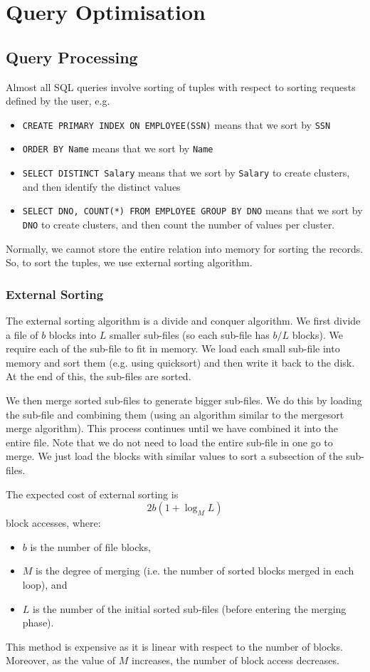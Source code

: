 \documentclass[a4paper, openany]{memoir}
\theoremstyle{definition}
\theoremstyle{plain}
\begin{document}
\chapter{Query Optimisation}
\section{Query Processing}
Almost all SQL queries involve sorting of tuples with respect to sorting requests defined by the user, e.g.
\begin{itemize}
    \item \texttt{CREATE PRIMARY INDEX ON EMPLOYEE(SSN)} means that we sort by \texttt{SSN}
    \item \texttt{ORDER BY Name} means that we sort by \texttt{Name}
    \item \texttt{SELECT DISTINCT Salary} means that we sort by \texttt{Salary} to create clusters, and then identify the distinct values
    \item \texttt{SELECT DNO, COUNT(*) FROM EMPLOYEE GROUP BY DNO} means that we sort by \texttt{DNO} to create clusters, and then count the number of values per cluster.
\end{itemize}
Normally, we cannot store the entire relation into memory for sorting the records. So, to sort the tuples, we use external sorting algorithm.

\subsection{External Sorting}
The external sorting algorithm is a divide and conquer algorithm. We first divide a file of $b$ blocks into $L$ smaller sub-files (so each sub-file has $b/L$ blocks). We require each of the sub-file to fit in memory. We load each small sub-file into memory and sort them (e.g. using quicksort) and then write it back to the disk. At the end of this, the sub-files are sorted. 

We then merge sorted sub-files to generate bigger sub-files. We do this by loading the sub-file and combining them (using an algorithm similar to the mergesort merge algorithm). This process continues until we have combined it into the entire file. Note that we do not need to load the entire sub-file in one go to merge. We just load the blocks with similar values to sort a subsection of the sub-files.

The expected cost of external sorting is
\[2b(1 + \log_M L)\]
block accesses, where:
\begin{itemize}
    \item $b$ is the number of file blocks,
    \item $M$ is the degree of merging (i.e. the number of sorted blocks merged in each loop), and
    \item $L$ is the number of the initial sorted sub-files (before entering the merging phase).
\end{itemize}
This method is expensive as it is linear with respect to the number of blocks. Moreover, as the value of $M$ increases, the number of block access decreases.
\end{document}
